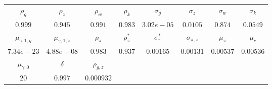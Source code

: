 \begin{tabular}{cccccccc} \\ \hline$\rho_g$&$\rho_z$&$\rho_w$&$\rho_k$&$\sigma_g$&$\sigma_z$&$\sigma_w$&$\sigma_k$\\$0.999$&$0.945$&$0.991$&$0.983$&$3.02e-05$&$0.0105$&$0.874$&$0.0549$\\ \hline$\mu_{\gamma,1,g}$&$\mu_{\gamma,1,z}$&$\rho_\pi$&$\rho_{\pi}^*$&$\sigma_{\pi}^*$&$\sigma_{\pi,z}$&$\mu_\pi$&$\mu_c$\\$7.34e-23$&$4.88e-08$&$0.983$&$0.937$&$0.00165$&$0.00131$&$0.00537$&$0.00536$\\ \hline$\mu_{\gamma,0}$&$\delta$&$\rho_{g,z}$\\$20$&$0.997$&$0.000932$\\ \hline \end{tabular}